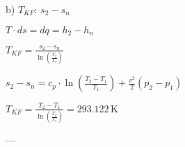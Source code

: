 b) \( T_{KF} \):  
\( s_2 - s_n \)  

\( T \cdot ds = dq = h_2 - h_n \)  

\( T_{KF} = \frac{s_2 - s_n}{\ln \left( \frac{T_2}{T_1} \right)} \)  

\( s_2 - s_n = c_p \cdot \ln \left( \frac{T_2 - T_1}{T_1} \right) + \frac{v^2}{2} (p_2 - p_1) \)  

\( T_{KF} = \frac{T_2 - T_1}{\ln \left( \frac{T_2}{T_1} \right)} = 293.122 \, \text{K} \)  

---